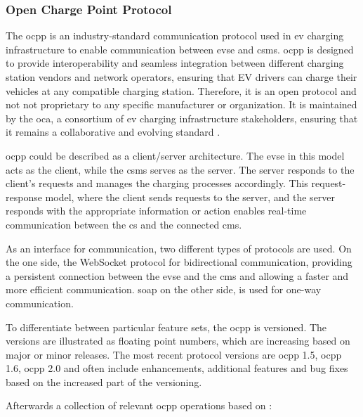 \subsubsection{Open Charge Point Protocol}
\label{ch:Introduction:sec:Electric Mobility:ssec:Communication protocols:sssec:Open Charge Point Protocol}

The \acrfull{ocpp} is an industry-standard communication protocol used in \acrshort{ev} charging infrastructure to enable communication between \acrshort{evse} and \acrshort{csms}. \acrshort{ocpp} is designed to provide interoperability and seamless integration between different charging station vendors and network operators, ensuring that EV drivers can charge their vehicles at any compatible charging station. Therefore, it is an open protocol and not not proprietary to any specific manufacturer or organization. It is maintained by the \acrfull{oca}, a consortium of \acrshort{ev} charging infrastructure stakeholders, ensuring that it remains a collaborative and evolving standard \cite{noauthor_ocpp_nodate-1}.

\acrshort{ocpp} could be described as a client/server architecture. The \acrshort{evse} in this model acts as the client, while the \acrshort{csms} serves as the server. The server responds to the client's requests and manages the charging processes accordingly. This request-response model, where the client sends requests to the server, and the server responds with the appropriate information or action enables real-time communication between the \acrfull{cs} and the connected \acrfull{cms}.

As an interface for communication, two different types of protocols are used. On the one side, the WebSocket protocol for bidirectional communication, providing a persistent connection between the \acrshort{evse} and the \acrshort{cms} and allowing a faster and more efficient communication. \acrfull{soap} on the other side, is used for one-way communication.

To differentiate between particular feature sets, the \acrshort{ocpp} is versioned. The versions are illustrated as floating point numbers, which are increasing based on major or minor releases. The most recent protocol versions are \acrshort{ocpp} 1.5, \acrshort{ocpp} 1.6, \acrshort{ocpp} 2.0 and often include enhancements, additional features and bug fixes based on the increased part of the versioning.

Afterwards a collection of relevant \acrshort{ocpp} operations based on \cite{noauthor_ocpp_nodate-1}:

